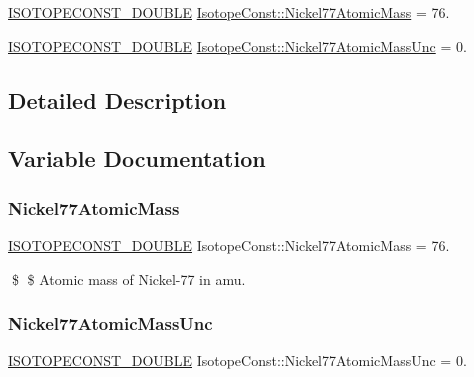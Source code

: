 \begin{DoxyCompactItemize}
\item 
\mbox{\hyperlink{group___isotope_const-_macros_ga8f45a7272ce02c0b4c65c44636ed719a}{I\+S\+O\+T\+O\+P\+E\+C\+O\+N\+S\+T\+\_\+\+D\+O\+U\+B\+LE}} \mbox{\hyperlink{group___isotope_const-_nickel-_ni77_ga56a42c274fcda613bb7c9c3932abe179}{Isotope\+Const\+::\+Nickel77\+Atomic\+Mass}} = 76.
\item 
\mbox{\hyperlink{group___isotope_const-_macros_ga8f45a7272ce02c0b4c65c44636ed719a}{I\+S\+O\+T\+O\+P\+E\+C\+O\+N\+S\+T\+\_\+\+D\+O\+U\+B\+LE}} \mbox{\hyperlink{group___isotope_const-_nickel-_ni77_gaf777f862f8f37497fec91e2b4be76464}{Isotope\+Const\+::\+Nickel77\+Atomic\+Mass\+Unc}} = 0.
\end{DoxyCompactItemize}


\subsection{Detailed Description}


\subsection{Variable Documentation}
\mbox{\label{group___isotope_const-_nickel-_ni77_ga56a42c274fcda613bb7c9c3932abe179}} 
\subsubsection{\texorpdfstring{Nickel77\+Atomic\+Mass}{Nickel77AtomicMass}}
{\footnotesize\ttfamily \mbox{\hyperlink{group___isotope_const-_macros_ga8f45a7272ce02c0b4c65c44636ed719a}{I\+S\+O\+T\+O\+P\+E\+C\+O\+N\+S\+T\+\_\+\+D\+O\+U\+B\+LE}} Isotope\+Const\+::\+Nickel77\+Atomic\+Mass = 76.}

\$ \$ Atomic mass of Nickel-\/77 in amu. \mbox{\label{group___isotope_const-_nickel-_ni77_gaf777f862f8f37497fec91e2b4be76464}} 
\subsubsection{\texorpdfstring{Nickel77\+Atomic\+Mass\+Unc}{Nickel77AtomicMassUnc}}
{\footnotesize\ttfamily \mbox{\hyperlink{group___isotope_const-_macros_ga8f45a7272ce02c0b4c65c44636ed719a}{I\+S\+O\+T\+O\+P\+E\+C\+O\+N\+S\+T\+\_\+\+D\+O\+U\+B\+LE}} Isotope\+Const\+::\+Nickel77\+Atomic\+Mass\+Unc = 0.}

